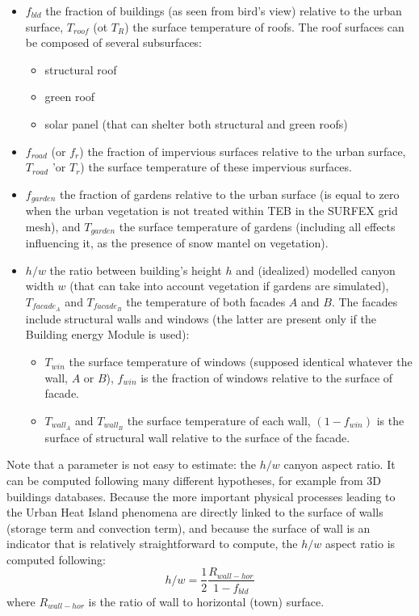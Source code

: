 \begin{itemize}
\item $f_{bld}$ the fraction of buildings (as seen from bird's view) relative to the urban surface, $T_{roof}$ (ot $T_R$) the surface temperature of roofs. The roof surfaces can be composed of several subsurfaces:
\begin{itemize}
\item structural roof
\item green roof
\item solar panel (that can shelter both structural and green roofs)
\end{itemize}
\item $f_{road}$ (or $f_r$) the fraction of impervious surfaces relative to the urban surface, $T_{road}$ 'or $T_r$) the surface temperature of these impervious surfaces.
\item $f_{garden}$ the fraction of gardens relative to the urban surface (is equal to zero when the urban vegetation is not treated within TEB in the SURFEX grid mesh), and $T_{garden}$ the surface temperature of gardens (including all effects influencing it, as the presence of snow mantel on vegetation).
\item $h/w$ the ratio between building's height $h$ and (idealized) modelled canyon width $w$ (that can take into account vegetation if gardens are simulated), $T_{facade_A}$ and $T_{facade_B}$  the temperature of both facades $A$ and $B$. The facades include structural walls and windows (the latter are present only if the Building energy Module is used):
\begin{itemize}
\item $T_{win}$ the surface temperature of windows (supposed identical whatever the wall, $A$ or $B$), $f_{win}$ is the fraction of windows relative to the surface of facade. 
\item $T_{wall_A}$ and $T_{wall_B}$ the surface temperature of each wall, $(1-f_{win})$ is the surface of structural wall relative to the surface of the facade.
\end{itemize}

\end{itemize}

Note that a parameter is not easy to estimate: the $h/w$ canyon aspect ratio. It can be computed following many different hypotheses, for example from 3D buildings databases. Because the more important physical processes leading to the Urban Heat Island phenomena are directly linked to the surface of walls (storage term and convection term), and because the surface of wall is an indicator that is relatively straightforward to compute, the $h/w$ aspect ratio is computed following:
\begin{displaymath}
h/w = \frac{1}{2} \frac{R_{wall-hor}}{1-f_{bld}}
\end{displaymath}
where $R_{wall-hor}$ is the ratio of wall to horizontal (town) surface. \\



